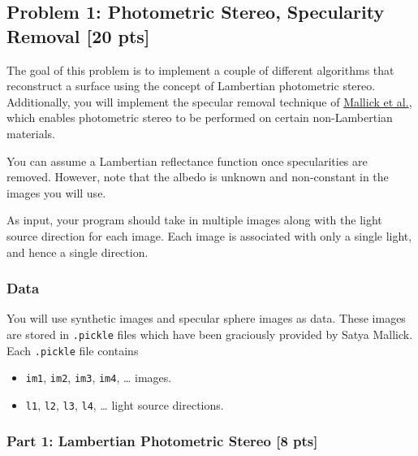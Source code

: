\documentclass[11pt]{article}
\providecommand{\tightlist}{%
      \setlength{\itemsep}{0pt}\setlength{\parskip}{0pt}}
\begin{document}
    \hypertarget{problem-1-photometric-stereo-specularity-removal-20-pts}{%
\subsection{Problem 1: Photometric Stereo, Specularity Removal {[}20
pts{]}}\label{problem-1-photometric-stereo-specularity-removal-20-pts}}

The goal of this problem is to implement a couple of different
algorithms that reconstruct a surface using the concept of Lambertian
photometric stereo. Additionally, you will implement the specular
removal technique of
\href{http://www.eecs.harvard.edu/~zickler/download/photodiff_cvpr05_preprint.pdf}{Mallick
et al.}, which enables photometric stereo to be performed on certain
non-Lambertian materials.

You can assume a Lambertian reflectance function once specularities are
removed. However, note that the albedo is unknown and non-constant in
the images you will use.

As input, your program should take in multiple images along with the
light source direction for each image. Each image is associated with
only a single light, and hence a single direction.

\hypertarget{data}{%
\subsubsection{Data}\label{data}}

You will use synthetic images and specular sphere images as data. These
images are stored in \texttt{.pickle} files which have been graciously
provided by Satya Mallick. Each \texttt{.pickle} file contains

\begin{itemize}
\tightlist
\item
  \texttt{im1}, \texttt{im2}, \texttt{im3}, \texttt{im4}, \ldots{}
  images.
\item
  \texttt{l1}, \texttt{l2}, \texttt{l3}, \texttt{l4}, \ldots{} light
  source directions.
\end{itemize}

    \hypertarget{part-1-lambertian-photometric-stereo-8-pts}{%
\subsubsection{Part 1: Lambertian Photometric Stereo {[}8
pts{]}}\label{part-1-lambertian-photometric-stereo-8-pts}}
\end{document}
